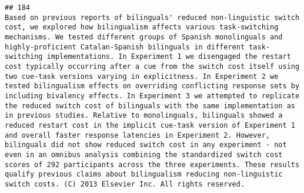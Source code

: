 \documentclass[
  english,
  man]{apa6}
\begin{document}
\begin{verbatim}
## 184                                                                                                                                                                                                                                                                                                                                                                                                                                                                                                                                                                                                                                                                                                                                                                                                                                                                                                                                                                                                                                                                                                                                                                                                                                                                                                                                                                                                         Based on previous reports of bilinguals' reduced non-linguistic switch cost, we explored how bilingualism affects various task-switching mechanisms. We tested different groups of Spanish monolinguals and highly-proficient Catalan-Spanish bilinguals in different task-switching implementations. In Experiment 1 we disengaged the restart cost typically occurring after a cue from the switch cost itself using two cue-task versions varying in explicitness. In Experiment 2 we tested bilingualism effects on overriding conflicting response sets by including bivalency effects. In Experiment 3 we attempted to replicate the reduced switch cost of bilinguals with the same implementation as in previous studies. Relative to monolinguals, bilinguals showed a reduced restart cost in the implicit cue-task version of Experiment 1 and overall faster response latencies in Experiment 2. However, bilinguals did not show reduced switch cost in any experiment - not even in an omnibus analysis combining the standardized switch cost scores of 292 participants across the three experiments. These results qualify previous claims about bilingualism reducing non-linguistic switch costs. (C) 2013 Elsevier Inc. All rights reserved.

\end{verbatim}
\end{document}
